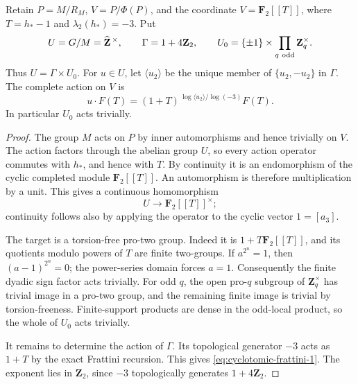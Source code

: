 \begin{proposition}
\label{prop:full-cyclotomic-frattini-action}
Retain \(P=M/R_M\), \(V=P/\Phi(P)\), and the coordinate
\(V=\mathbf F_2[[T]]\), where \(T=h_*-1\) and
\(\lambda_2(h_*)=-3\).
Put
\[
 U=G/M=\widehat{\mathbf Z}^{\,\times},\qquad
 \Gamma=1+4\mathbf Z_2,\qquad
 U_0=\{\pm1\}\times\prod_{q\ {\rm odd}}\mathbf Z_q^\times.
\]
Thus \(U=\Gamma\times U_0\).
For \(u\in U\), let \(\langle u_2\rangle\) be the unique member
of \(\{u_2,-u_2\}\) in \(\Gamma\).
The complete action on \(V\) is
\begin{equation}
 u\cdot F(T)
   =(1+T)^{\,\log\langle u_2\rangle/\log(-3)}F(T).        \label{eq:cyclotomic-frattini-1}
\end{equation}
In particular \(U_0\) acts trivially.
\end{proposition}

\begin{proof}
The group \(M\) acts on \(P\) by inner automorphisms and hence
trivially on \(V\). The action factors through the abelian group
\(U\), so every action operator commutes with \(h_*\), and hence
with \(T\). By continuity it is an endomorphism of the cyclic
completed module \(\mathbf F_2[[T]]\).
An automorphism is therefore multiplication by a unit.
This gives a continuous homomorphism
\[
 U\longrightarrow\mathbf F_2[[T]]^\times;
\]
continuity follows also by applying the operator to the cyclic
vector \(1=[a_3]\).

The target is a torsion-free pro-two group.
Indeed it is \(1+T\mathbf F_2[[T]]\), and its quotients modulo
powers of \(T\) are finite two-groups.
If \(a^{2^n}=1\), then \((a-1)^{2^n}=0\); the power-series
domain forces \(a=1\).
Consequently the finite dyadic sign factor acts trivially.
For odd \(q\), the open pro-\(q\) subgroup of
\(\mathbf Z_q^\times\) has trivial image in a pro-two group,
and the remaining finite image is trivial by torsion-freeness.
Finite-support products are dense in the odd-local product,
so the whole of \(U_0\) acts trivially.

It remains to determine the action of \(\Gamma\).
Its topological generator \(-3\) acts as \(1+T\) by the exact
Frattini recursion. This gives \eqref{eq:cyclotomic-frattini-1}.
The exponent lies in \(\mathbf Z_2\), since \(-3\)
topologically generates \(1+4\mathbf Z_2\).
\end{proof}

